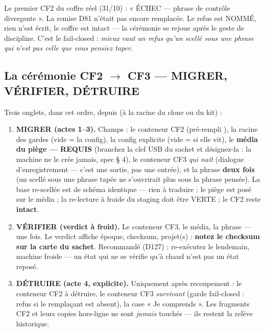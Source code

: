 \begin{terrain}
Le premier  CF2 du coffre réel (31/10) : « ÉCHEC — phrase de contrôle
divergente ». La remise D81 n'était pas encore remplacée. Le refus est NOMMÉ, rien
n'est écrit, le coffre est intact — la cérémonie se rejoue après le geste de
discipline. C'est le fail-closed : \emph{mieux vaut un refus qu'un scellé sous une
phrase qui n'est pas celle que vous pensiez taper}.
\end{terrain}

\subsection{La cérémonie CF2 $\to$ CF3 — MIGRER, VÉRIFIER, DÉTRUIRE}\label{sec:cercf3}

Trois onglets, dans cet ordre, depuis  (à la racine du
clone ou du kit) :

\begin{enumerate}
\item \textbf{MIGRER (actes 1--3).} Champs : le conteneur CF2 (pré-rempli
), la racine des gardes (vide = la
config), la config explicite (vide =  si
elle vit), le \textbf{média du piège — REQUIS} (branchez la clef USB du sachet et
désignez-la : la machine ne le crée jamais, spec § 4), le conteneur CF3 \emph{qui
naît} (dialogue d'enregistrement — c'est une sortie, pas une entrée), et la phrase
\textbf{deux fois} (un scellé sous une phrase tapée ne s'ouvrirait plus sous la
phrase pensée). La base re-scellée est de schéma identique — rien à traduire ; le
piège est posé sur le média ; la re-lecture à froide du staging doit être VERTE ; le
CF2 reste \textbf{intact}.
\item \textbf{VÉRIFIER (verdict à froid).} Le conteneur CF3, le média, la phrase —
une fois. Le verdict affiche époque, checksum, projet(s) : \textbf{notez le checksum
sur la carte du sachet}. Recommandé (D127) : re-exécutez le lendemain, machine
froide — un état qui ne se vérifie qu'à chaud n'est pas un état reposé.
\item \textbf{DÉTRUIRE (acte 4, explicite).} Uniquement après recoupement : le
conteneur CF2 à détruire, le conteneur CF3 \emph{survivant} (garde fail-closed : refus
si le remplaçant est absent), la case « Je comprends ». Les fragments CF2 et leurs
copies hors-ligne ne sont \emph{jamais} touchés — ils restent la relève historique.
\end{enumerate}

